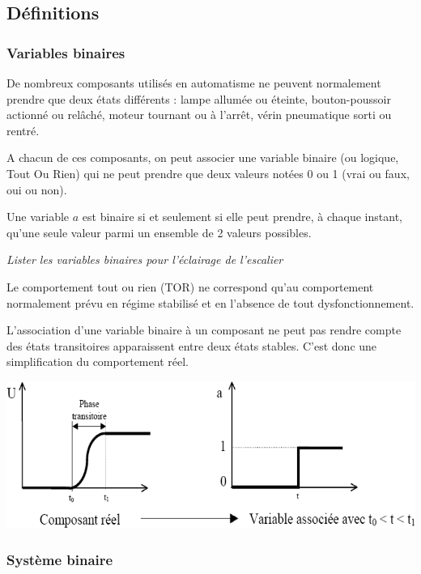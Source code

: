 \documentclass[11pt,oneside]{article}
\begin{document}
\subsection{Définitions}
\subsubsection{Variables binaires}
De nombreux composants utilisés en automatisme ne peuvent normalement prendre que deux états différents : lampe allumée ou éteinte, bouton-poussoir actionné ou relâché, moteur tournant ou à l'arrêt, vérin pneumatique sorti ou rentré. 


A chacun de ces composants, on peut associer une variable binaire (ou logique, Tout Ou Rien) qui ne peut prendre que deux valeurs notées 0 ou 1 (vrai ou faux, oui ou non). 

\begin{defi}
Une variable $a$ est binaire si et seulement si elle peut prendre, à chaque instant, qu'une seule valeur parmi un ensemble de 2 valeurs possibles. 
\end{defi}

\begin{exemple}
\textit{Lister les variables binaires pour l'éclairage de l'escalier}
\end{exemple}

\begin{rem}
Le comportement tout ou rien (TOR) ne correspond qu'au comportement normalement prévu en régime stabilisé et en l'absence de tout dysfonctionnement. 

L'association d'une variable binaire à un composant ne peut pas rendre compte des états transitoires apparaissent entre deux états stables. C'est donc une simplification du comportement réel.
\end{rem}


\begin{center}
\includegraphics[width=.8\textwidth]{png/fig_07}
\end{center}

\subsubsection{Système binaire}
\end{document}
